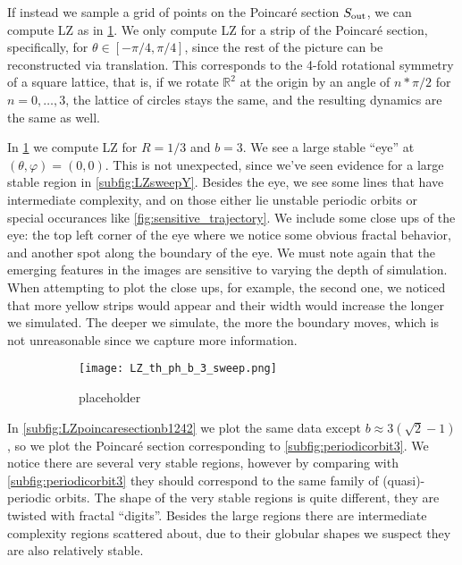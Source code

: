 If instead we sample a grid of points on the Poincar\'e section $S_\text{out}$, we can compute LZ as in \cref{subfig:LZpoincaresectionb3}. We only compute LZ for a strip of the Poincar\'e section, specifically, for $\theta\in[-\pi/4,\pi/4]$, since the rest of the picture can be reconstructed via translation. This corresponds to the 4-fold rotational symmetry of a square lattice, that is, if we rotate $\mathbb R^2$ at the origin by an angle of $n*\pi/2$ for $n=0,\dots, 3$, the lattice of circles stays the same, and the resulting dynamics are the same as well.

In \cref{subfig:LZpoincaresectionb3} we compute LZ for $R=1/3$ and $b=3$. We see a large stable ``eye'' at $(\theta, \varphi)=(0,0)$. This is not unexpected, since we've seen evidence for a large stable region in \cref{subfig:LZsweepY}. Besides the eye, we see some lines that have intermediate complexity, and on those either lie unstable periodic orbits or special occurances like \cref{fig:sensitive_trajectory}. We include some close ups of the eye: the top left corner of the eye where we notice some obvious fractal behavior, and another spot along the boundary of the eye. We must note again that the emerging features in the images are sensitive to varying the depth of simulation. When attempting to plot the close ups, for example, the second one, we noticed that more yellow strips would appear and their width would increase the longer we simulated. The deeper we simulate, the more the boundary moves, which is not unreasonable since we capture more information.

\begin{figure}[!th]
\centering
\hfill
\begin{subfigure}[h]{0.49\textwidth}
\centering
\texttt{[image: LZ\_th\_ph\_b\_3\_sweep.png]}
\caption{}
\label{subfig:LZpoincaresectionb3}
\end{subfigure}
%
\begin{subfigure}[h]{0.49\textwidth}
\centering
%
%
\caption{placeholder}
\end{subfigure}
\caption{}
\end{figure}


In \cref{subfig:LZpoincaresectionb1242} we plot the same data except $b\approx3(\sqrt2-1)$, so we plot the Poincar\'e section corresponding to \cref{subfig:periodicorbit3}. We notice there are several very stable regions, however by comparing with \cref{subfig:periodicorbit3} they should correspond to the same family of (quasi)-periodic orbits. The shape of the very stable regions is quite different, they are twisted with fractal ``digits''. Besides the large regions there are intermediate complexity regions scattered about, due to their globular shapes we suspect they are also relatively stable.

